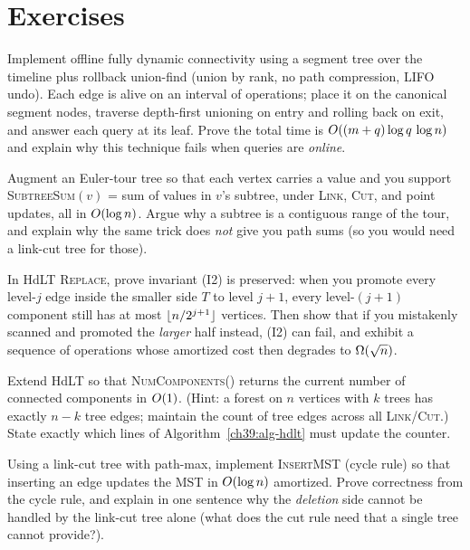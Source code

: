 \section{Exercises}
\label{ch39:exercises}

\begin{exercise}
Implement offline fully dynamic connectivity using a segment tree over the
timeline plus rollback union-find (union by rank, no path compression, LIFO undo).
Each edge is alive on an interval of operations; place it on the canonical segment
nodes, traverse depth-first unioning on entry and rolling back on exit, and answer each
query at its leaf. Prove the total time is $O((m+q)\log q\,\log n)$ and explain why
this technique fails when queries are \emph{online}.
\end{exercise}

\begin{exercise}
Augment an Euler-tour tree so that each vertex carries a value and you support
\textsc{SubtreeSum}$(v)$ = sum of values in $v$'s subtree, under \textsc{Link},
\textsc{Cut}, and point updates, all in $O(\log n)$. Argue why a subtree is a
contiguous range of the tour, and explain why the same trick does \emph{not} give
you path sums (so you would need a link-cut tree for those).
\end{exercise}

\begin{exercise}
In HdLT \textsc{Replace}, prove invariant (I2) is preserved: when you promote every
level-$j$ edge inside the smaller side $T$ to level $j{+}1$, every level-$(j{+}1)$
component still has at most $\lfloor n/2^{j+1}\rfloor$ vertices. Then show that if
you mistakenly scanned and promoted the \emph{larger} half instead, (I2) can fail,
and exhibit a sequence of operations whose amortized cost then degrades to
$\Omega(\sqrt n)$.
\end{exercise}

\begin{exercise}
Extend HdLT so that \textsc{NumComponents}() returns the current number of
connected components in $O(1)$. (Hint: a forest on $n$ vertices with $k$ trees
has exactly $n-k$ tree edges; maintain the count of tree edges across all
\textsc{Link}/\textsc{Cut}.) State exactly which lines of
Algorithm~\ref{ch39:alg-hdlt} must update the counter.
\end{exercise}

\begin{exercise}
Using a link-cut tree with path-max, implement \textsc{InsertMST} (cycle rule) so
that inserting an edge updates the MST in $O(\log n)$ amortized. Prove
correctness from the cycle rule, and explain in one sentence why the \emph{deletion}
side cannot be handled by the link-cut tree alone (what does the cut rule need that
a single tree cannot provide?).
\end{exercise}

